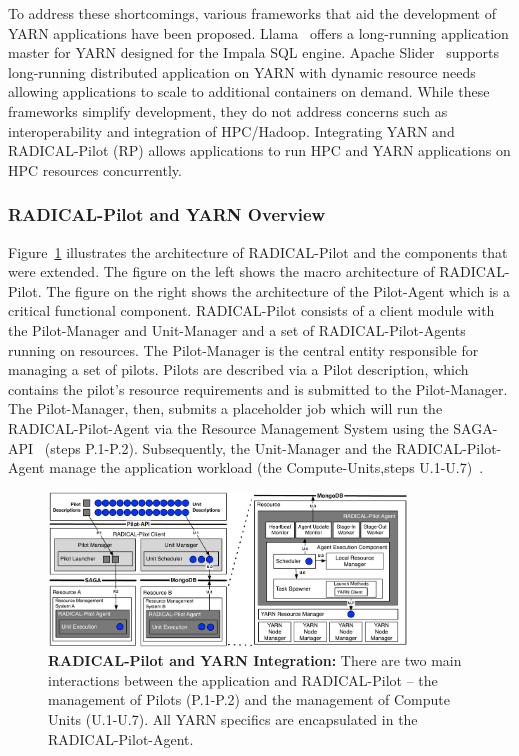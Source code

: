To address these shortcomings, various frameworks that aid the development of YARN applications have been proposed.
Llama~\cite{llama} offers a long-running application master for YARN designed for the Impala SQL engine.
Apache Slider~\cite{apache-slider} supports long-running distributed application on YARN with dynamic resource needs allowing applications to scale to additional containers on demand.
While these frameworks simplify development, they do not address concerns such as interoperability and integration of HPC/Hadoop.
Integrating YARN and RADICAL-Pilot (RP) allows applications to run HPC and YARN applications on HPC resources concurrently.

\subsubsection*{RADICAL-Pilot and YARN Overview}
\label{sssec:rp_yarn}
Figure~\ref{fig:comp_rp_arch} illustrates the architecture of RADICAL-Pilot and the components that were extended.
The figure on the left shows the macro architecture of RADICAL-Pilot.
The figure on the right shows the architecture of the Pilot-Agent which is a critical functional component.
RADICAL-Pilot consists of a client module with the Pilot-Manager and Unit-Manager and a set of RADICAL-Pilot-Agents running on resources.
The Pilot-Manager is the central entity responsible for managing a set of pilots.
Pilots are described via a Pilot description, which contains the pilot's resource requirements and is submitted to the Pilot-Manager.
The Pilot-Manager, then, submits a placeholder job which will run the RADICAL-Pilot-Agent via the Resource Management System using the SAGA-API~\cite{merzky2015saga} (steps P.1-P.2).
Subsequently, the Unit-Manager and the RADICAL-Pilot-Agent manage the application workload (the Compute-Units,steps U.1-U.7)~\cite{merzky2019using}.

\begin{figure}
    \centering
    \includegraphics[width=0.85\textwidth]{figures/data_analytics_hpc/hpc_hadoop/rp-architecture-yarn.pdf}
    \caption{\textbf{RADICAL-Pilot and YARN Integration:} There are two main interactions between the application and RADICAL-Pilot -- the management of Pilots (P.1-P.2) and the management of Compute Units (U.1-U.7).  All YARN specifics are encapsulated in the RADICAL-Pilot-Agent.\label{fig:comp_rp_arch}}
\end{figure}

